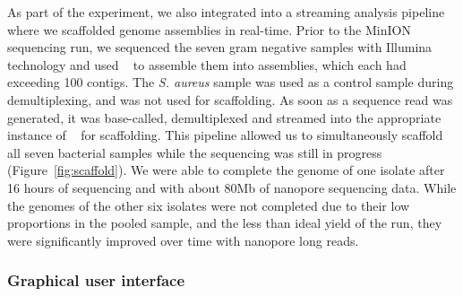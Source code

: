 As part of the experiment, we also integrated \npbarcode{} into a streaming analysis
pipeline where we scaffolded genome assemblies in real-time. Prior 
to the MinION sequencing run, we sequenced the seven gram negative samples with
Illumina technology and used \spades{}~\cite{BankevichNA2012} to assemble them into
assemblies, which each had exceeding 
100 contigs. The \emph{S. aureus} sample was used as a control sample during 
demultiplexing, and was not used for scaffolding.
As soon as a sequence read was generated, it was base-called, demultiplexed and
streamed into the appropriate instance of \npscarf{}~\cite{Cao2017scaffolding} 
for scaffolding. This
pipeline allowed us to simultaneously scaffold all seven bacterial samples while
the sequencing was still in progress (Figure~\ref{fig:scaffold}). We were able 
to complete the genome of one \kp{} isolate after 16 hours of
sequencing and with about 80Mb of nanopore sequencing data. While the genomes of 
the other six isolates were not completed due to their low proportions in the 
pooled sample, and the less than ideal yield of the run, they were significantly
improved over time with nanopore long reads.

\subsubsection{Graphical user interface}

